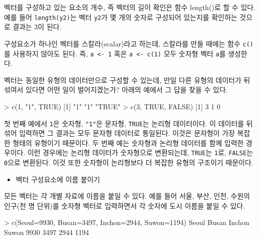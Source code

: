\documentclass[
]{book}
\newenvironment{Shaded}{\begin{snugshade}}{\end{snugshade}}
\newcommand{\AttributeTok}[1]{\textcolor[rgb]{0.77,0.63,0.00}{#1}}
\newcommand{\ConstantTok}[1]{\textcolor[rgb]{0.00,0.00,0.00}{#1}}
\newcommand{\DecValTok}[1]{\textcolor[rgb]{0.00,0.00,0.81}{#1}}
\newcommand{\FunctionTok}[1]{\textcolor[rgb]{0.00,0.00,0.00}{#1}}
\newcommand{\NormalTok}[1]{#1}
\newcommand{\SpecialCharTok}[1]{\textcolor[rgb]{0.00,0.00,0.00}{#1}}
\newcommand{\StringTok}[1]{\textcolor[rgb]{0.31,0.60,0.02}{#1}}
\providecommand{\tightlist}{%
  \setlength{\itemsep}{0pt}\setlength{\parskip}{0pt}}
\begin{document}
벡터를 구성하고 있는 요소의 개수, 즉 벡터의 길이 확인은 함수 length()로 할 수 있다.
예를 들어 \texttt{length(y2)}는 벡터 \texttt{y2}가 몇 개의 숫자로 구성되어 있는지를 확인하는 것으로 결과는 3이 된다.

구성요소가 하나인 벡터를 스칼라(scalar)라고 하는데, 스칼라를 만들 때에는 함수 \texttt{c()}를 사용하지 않아도 된다.
즉, \texttt{a\ \textless{}-\ 1} 혹은 \texttt{a\ \textless{}-\ c(1)} 모두 숫자형 벡터 \texttt{a}를 생성한다.

벡터는 동일한 유형의 데이터만으로 구성할 수 있는데, 만일 다른 유형의 데이터가 뒤섞여서 있다면 어떤 일이 벌어지겠는가?
아래의 예에서 그 답을 찾을 수 있다.

\begin{Shaded}
\begin{Highlighting}[]
\SpecialCharTok{\textgreater{}} \FunctionTok{c}\NormalTok{(}\DecValTok{1}\NormalTok{, }\StringTok{"1"}\NormalTok{, }\ConstantTok{TRUE}\NormalTok{)}
\NormalTok{[}\DecValTok{1}\NormalTok{] }\StringTok{"1"}    \StringTok{"1"}    \StringTok{"TRUE"}
\SpecialCharTok{\textgreater{}} \FunctionTok{c}\NormalTok{(}\DecValTok{3}\NormalTok{, }\ConstantTok{TRUE}\NormalTok{, }\ConstantTok{FALSE}\NormalTok{)}
\NormalTok{[}\DecValTok{1}\NormalTok{] }\DecValTok{3} \DecValTok{1} \DecValTok{0}
\end{Highlighting}
\end{Shaded}

첫 번째 예에서 \texttt{1}은 숫자형, \texttt{"1"}은 문자형, \texttt{TRUE}는 논리형 데이터이다.
이 데이터를 뒤섞어 입력하면 그 결과는 모두 문자형 데이터로 통일된다.
이것은 문자형이 가장 복잡한 형태의 유형이기 때문이다.
두 번째 예는 숫자형과 논리형 데이터를 함께 입력한 경우이다.
이런 경우에는 논리형 데이터가 숫자형으로 변환되는데, \texttt{TRUE}는 \texttt{1}로, \texttt{FALSE}는 \texttt{0}으로 변환된다.
이것 또한 숫자형이 논리형보다 더 복잡한 유형의 구조이기 때문이다.

\begin{itemize}
\tightlist
\item
  벡터 구성요소에 이름 붙이기
\end{itemize}

모든 벡터는 각 개별 자료에 이름을 붙일 수 있다.
예를 들어 서울, 부산, 인천, 수원의 인구(천 명 단위)를 숫자형 벡터로 입력하면서 각 숫자에 도시 이름을 붙일 수 있다.

\begin{Shaded}
\begin{Highlighting}[]
\SpecialCharTok{\textgreater{}} \FunctionTok{c}\NormalTok{(}\AttributeTok{Seoul=}\DecValTok{9930}\NormalTok{, }\AttributeTok{Busan=}\DecValTok{3497}\NormalTok{, }\AttributeTok{Inchon=}\DecValTok{2944}\NormalTok{, }\AttributeTok{Suwon=}\DecValTok{1194}\NormalTok{)}
\NormalTok{ Seoul  Busan Inchon  Suwon }
  \DecValTok{9930}   \DecValTok{3497}   \DecValTok{2944}   \DecValTok{1194} 
\end{Highlighting}
\end{Shaded}
\end{document}
